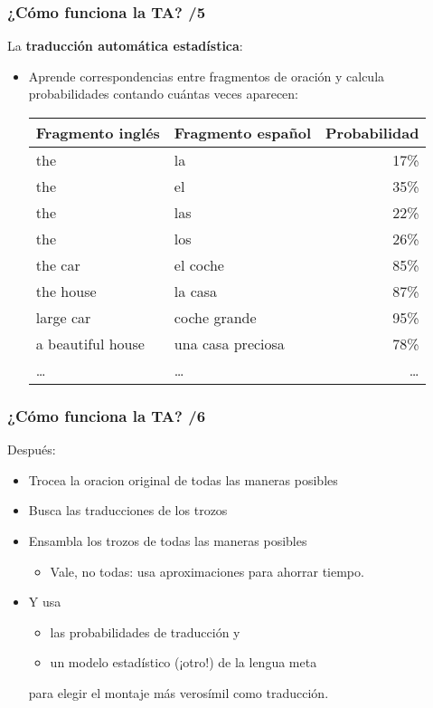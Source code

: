 \documentclass{beamer}
\begin{document}
\begin{frame}
\frametitle{¿Cómo funciona la TA? /5}

La \textbf{traducción automática estadística}:
\begin{itemize}
\item Aprende correspondencias entre fragmentos de oración y calcula probabilidades contando cuántas veces aparecen:
\begin{center}
  \begin{tabular}{l|l|r}
  \textbf{Fragmento inglés} & \textbf{Fragmento español} & Probabilidad \\
  \hline
  the  & la  & 17\% \\
  the  & el & 35\% \\
  the  & las & 22\% \\
  the  & los & 26\% \\
  the car & el coche & 85\% \\
  the house & la casa & 87\% \\
  large car & coche grande & 95\% \\
  a beautiful house & una casa preciosa & 78\% \\
  \ldots & \ldots & \ldots \\
  \end{tabular}
\end{center}

\end{itemize}
\end{frame}

\begin{frame}
  \frametitle{¿Cómo funciona la TA? /6}
  Después:
  \begin{itemize}
  \item Trocea la oracion original de todas las maneras posibles
  \item Busca las traducciones de los trozos
  \item Ensambla los trozos de todas las maneras posibles
    \begin{itemize}
    \item Vale, no todas: usa aproximaciones para ahorrar tiempo.
    \end{itemize}
  \item Y usa 
    \begin{itemize}
    \item las probabilidades de traducción y
    \item un modelo estadístico (¡otro!) de la lengua meta
    \end{itemize}
   para elegir el montaje más verosímil como traducción.
  \end{itemize}
\end{frame}
\end{document}
